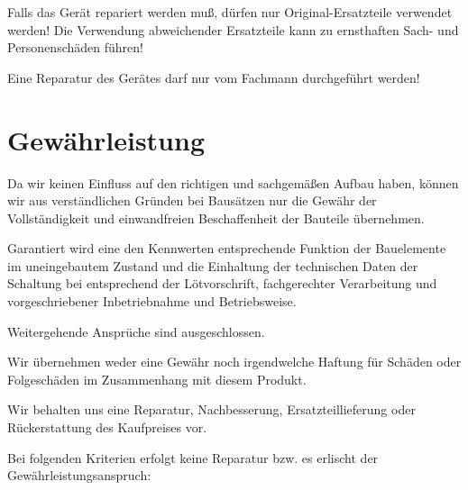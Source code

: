 \documentclass[fleqn,10pt]{SelfArx} %
\begin{document}
Falls das Gerät repariert werden muß, dürfen nur Original-Ersatzteile verwendet werden! Die Verwendung abweichender Ersatzteile kann zu ernsthaften Sach- und Personenschäden führen!

Eine Reparatur des Gerätes darf nur vom Fachmann durchgeführt werden!


\section{Gewährleistung}

Da wir keinen Einfluss auf den richtigen und sachgemäßen Aufbau haben, können wir aus verständlichen Gründen bei Bausätzen nur die Gewähr der Vollständigkeit und einwandfreien Beschaffenheit der Bauteile übernehmen.

Garantiert wird eine den Kennwerten entsprechende Funktion der Bauelemente im uneingebautem Zustand und die Einhaltung der technischen Daten der Schaltung bei entsprechend der Lötvorschrift,
fachgerechter Verarbeitung und vorgeschriebener Inbetriebnahme und Betriebsweise.

Weitergehende Ansprüche sind ausgeschlossen.

Wir übernehmen weder eine Gewähr noch irgendwelche Haftung für Schäden oder Folgeschäden im Zusammenhang mit diesem Produkt.

Wir behalten uns eine Reparatur, Nachbesserung, Ersatzteillieferung oder Rückerstattung des Kaufpreises vor.

Bei folgenden Kriterien erfolgt keine Reparatur bzw. es erlischt der Gewährleistungsanspruch:
\end{document}
